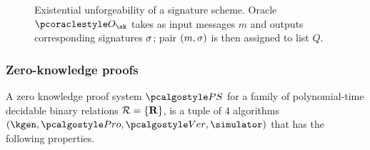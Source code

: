 \documentclass[runningheads,10pt]{llncs}
\numberwithin{equation}{section}
\begin{document}
\begin{figure}
\centering
{} \caption{Existential unforgeability of a signature scheme. Oracle
$\oracleo_\sk$ takes as input messages $m$ and outputs corresponding signatures
$\sigma$; pair $(m, \sigma)$ is then assigned to list $Q$.}
\label{fig:euf}
\end{figure}

\subsubsection{Zero-knowledge proofs}
A zero knowledge proof system $\proofsystem$ for a family of polynomial-time
decidable binary relations $\mathcal{R} = \{\mathbf{R}\}$, is a tuple of 4
algorithms $(\kgen, \prover, \verifier, \simulator)$ that has the following
properties.
\end{document}
